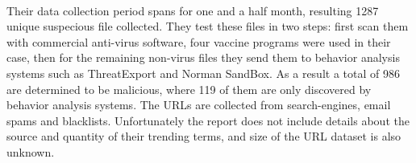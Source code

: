 \paragraph{}
Their data collection period spans for one and a half month, resulting 1287 
unique suspecious file collected. They test these files in two steps: first 
scan them with commercial anti-virus software, four vaccine programs were used 
in their case,  then for the remaining non-virus files they send them to 
behavior analysis systems such as ThreatExport and Norman SandBox. As a result 
a total of 986 are determined to be malicious, where 119 of them are only 
discovered by behavior analysis systems. 
The URLs are collected from search-engines, email spams and blacklists. 
Unfortunately the report does not include details about the source and 
quantity of their trending terms, and size of the URL dataset is also unknown. 
